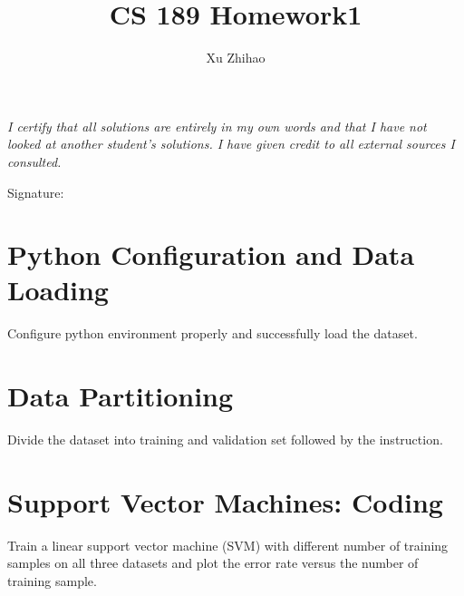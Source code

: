 \documentclass[a4paper,12pt]{article}
\title{CS 189 Homework1}
\author{Xu Zhihao}
\begin{document}
\pagestyle{fancy}{}
\fancyhf{} 
\rhead{\thepage \  / \pageref{LastPage}}

\maketitle

\emph{I certify that all solutions are entirely in my own words and that I have not looked at another student’s solutions. I have given credit to all external sources I consulted.} 
\begin{flushright}
Signature: \quad \quad \quad \quad \quad \quad \quad \quad \quad \quad \quad
\end{flushright}
\vspace{100pt}

\tableofcontents

\clearpage
\section{Python Configuration and Data Loading}
Configure python environment properly and successfully load the dataset.

\section{Data Partitioning}
Divide the dataset into training and validation set followed by the instruction.

\section{Support Vector Machines: Coding}
Train a linear support vector machine (SVM) with different number of training samples on all three datasets and plot the error rate versus the number of training sample.
\end{document}
